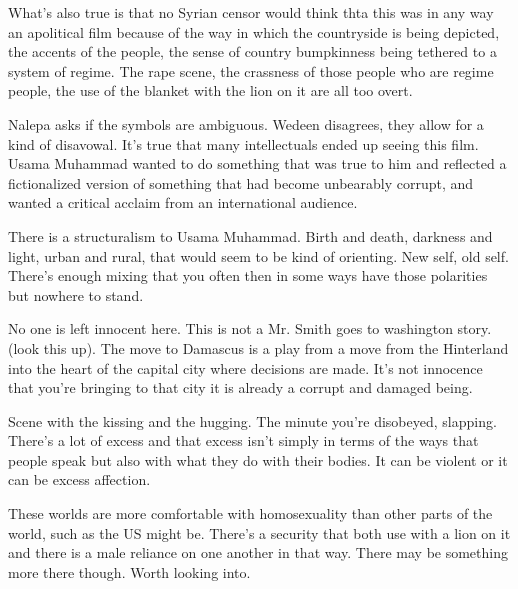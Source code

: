 \documentclass{article}
\begin{document}
\vspace{5mm}

What's also true is that no Syrian censor would think thta this was in any way an apolitical film because of the way in which the countryside is being depicted, the accents of the people, the sense of country bumpkinness being tethered to a system of regime.  The rape scene, the crassness of those people who are regime people, the use of the blanket with the lion on it are all too overt.  

\vspace{5mm}

Nalepa asks if the symbols are ambiguous.  Wedeen disagrees, they allow for a kind of disavowal.  It's true that many intellectuals ended up seeing this film.  Usama Muhammad wanted to do something that was true to him and reflected a fictionalized version of something that had become unbearably corrupt, and wanted a critical acclaim from an international audience.  

\vspace{5mm}

There is a structuralism to Usama Muhammad.  Birth and death, darkness and light, urban and rural, that would seem to be kind of orienting.  New self, old self.  There's enough mixing that you often then in some ways have those polarities but nowhere to stand.  

\vspace{5mm}

No one is left innocent here.  This is not a Mr. Smith goes to washington story.  (look this up).  The move to Damascus is a play from a move from the Hinterland into the heart of the capital city where decisions are made.  It's not innocence that you're bringing to that city it is already a corrupt and damaged being.  

\vspace{5mm}

Scene with the kissing and the hugging.  The minute you're disobeyed, slapping.  There's a lot of excess and that excess isn't simply in terms of the ways that people speak but also with what they do with their bodies.  It can be violent or it can be excess affection.  

\vspace{5mm}

These worlds are more comfortable with homosexuality than other parts of the world, such as the US might be.  There's a security that both use with a lion on it and there is a male reliance on one another in that way.  There may be something more there though.  Worth looking into.  
\end{document}
